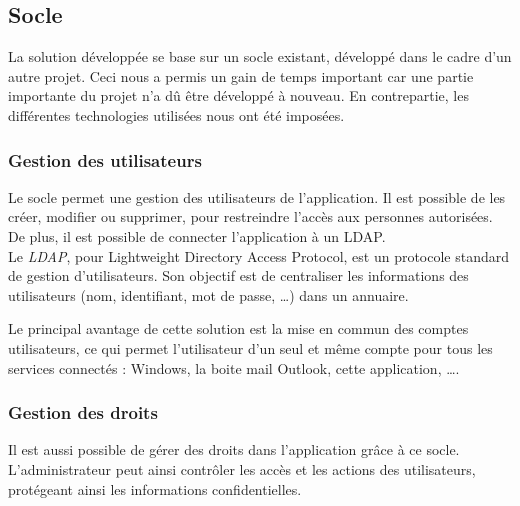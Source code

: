 
\subsection{Socle}

La solution développée se base sur un socle existant, développé dans le cadre d'un autre projet.
Ceci nous a permis un gain de temps important car une partie importante du projet n'a dû être développé à nouveau.
En contrepartie, les différentes technologies utilisées nous ont été imposées.


\subsubsection{Gestion des utilisateurs}

Le socle permet une gestion des utilisateurs de l'application.
Il est possible de les créer, modifier ou supprimer, pour restreindre l'accès aux personnes autorisées.
De plus, il est possible de connecter l'application à un LDAP.
\\

Le \textit{LDAP}, pour Lightweight Directory Access Protocol, est un protocole standard de gestion d'utilisateurs.
Son objectif est de centraliser les informations des utilisateurs (nom, identifiant, mot de passe, \ldots) dans un annuaire.

Le principal avantage de cette solution est la mise en commun des comptes utilisateurs, ce qui permet l'utilisateur d'un seul et même compte pour tous les services connectés : Windows, la boite mail Outlook, cette application, \ldots.


\subsubsection{Gestion des droits}

Il est aussi possible de gérer des droits dans l'application grâce à ce socle.
L'administrateur peut ainsi contrôler les accès et les actions des utilisateurs, protégeant ainsi les informations confidentielles.
\\


